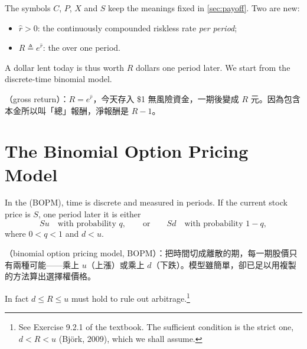 
\begin{notation}
	The symbols $C$, $P$, $X$ and $S$ keep the meanings fixed in \autoref{sec:payoff}.
	Two are new:
	\begin{itemize}[nosep]
		\item $\hat{r}>0$: the continuously compounded riskless rate \emph{per period};
		\item $R\triangleq e^{\hat{r}}$: the  over one period.
	\end{itemize}
	A dollar lent today is thus worth $R$ dollars one period later.
	We start from the discrete-time binomial model.
\end{notation}

\suppstart
\begin{remark}
	（gross return）：$R=e^{\hat{r}}$，今天存入 \$1 無風險資金，一期後變成 $R$ 元。因為包含本金所以叫「總」報酬，淨報酬是 $R-1$。
\end{remark}
\suppend

\section{The Binomial Option Pricing Model}
\label{sec:bopm}


\begin{definition}
	In the  (BOPM), time is discrete and measured in periods.
	If the current stock price is $S$, one period later it is either
	\[
		Su \quad\text{with probability } q,
		\qquad\text{or}\qquad
		Sd \quad\text{with probability } 1-q ,
	\]
	where $0<q<1$ and $d<u$.
\end{definition}

\suppstart
\begin{remark}
	（binomial option pricing model, BOPM）：把時間切成離散的期，每一期股價只有兩種可能——乘上 $u$（上漲）或乘上 $d$（下跌）。模型雖簡單，卻已足以用複製的方法算出選擇權價格。
\end{remark}
\suppend

In fact $d\le R\le u$ must hold to rule out arbitrage.\footnote{See Exercise 9.2.1 of the textbook. The sufficient condition is the strict one, $d<R<u$ (Björk, 2009), which we shall assume.}

